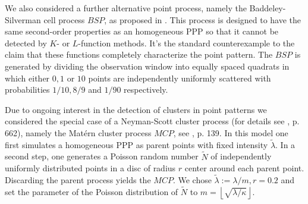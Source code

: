 \documentclass[12pt]{article}
\begin{document}
We also considered a further alternative point process, namely the Baddeley-Silverman cell process $BSP$, as proposed in \cite{32}. This process is designed to have the same second-order properties as an homogeneous PPP so that it cannot be detected by $K$- or $L$-function methods. It's the standard counterexample to the claim that these functions completely characterize the point pattern. The $BSP$ is generated by dividing the observation window into equally spaced quadrats in which either $0, 1$ or $10$ points are independently uniformly scattered with probabilities $1\slash10, 8\slash9$ and $1\slash90$ respectively.

Due to ongoing interest in the detection of clusters in point patterns we considered the special case of a Neyman-Scott cluster process (for details see \cite{15}, p. 662), namely the Mat\'ern cluster process $MCP$, see \cite{spatstat}, p. 139. In this model one first simulates a homogeneous PPP as parent points with fixed intensity $\widetilde{\lambda}$. In a second step, one generates  a Poisson random number $\widetilde{N}$ of independently uniformly distributed points in a disc of radius $r$ center around each parent point. Discarding the parent process yields the $MCP$. We chose $\widetilde{\lambda}:=\lambda\slash m, r=0.2$ and set the parameter of the Poisson distribution of $\widetilde{N}$ to $m=\scriptstyle\left\lfloor\sqrt{\lambda\slash\kappa}\right\rfloor$.
\end{document}
